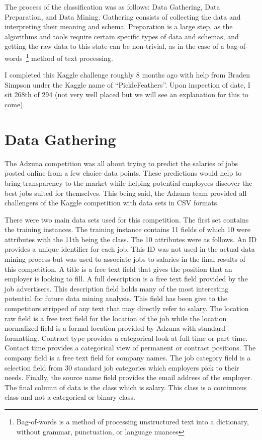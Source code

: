 \documentclass[conference]{IEEEtran}
\begin{document}
The process of the classification was as follows: Data Gathering, Data Preparation, and Data Mining. Gathering consists of 
collecting the data and interpreting their meaning and schema. Preparation is a large step, as the algorithms and tools require 
certain specific types of data and schemas, and getting the raw data to this state can be non-trivial, as in the case of a 
bag-of-words~\footnote{Bag-of-words is a method of processing unstructured text into a dictionary, without grammar, 
punctuation, or language nuances} method of text processing.

I completed this Kaggle challenge roughly 8 months ago with help from Braden Simpson under the Kaggle name
of ``PickleFeathers''. Upon inspection of date, I sit 268th of 294
(not very well placed but we will see an explanation for this to come).

\section{Data Gathering}

The Adzuna competition was all about trying to predict the salaries of jobs posted
online from a few choice data points. These predictions would help to bring transparency 
to the market while helping potential employees discover the best jobs suited for themselves. 
This being said, the Adzuna team provided all challengers of the Kaggle competition 
with data sets in CSV formats.

There were two main data sets used for this competition. The first set contains the training instances. 
The training instance contains 11 fields of which 10 were attributes with the 11th being the class. 
The 10 attributes were as follows. An ID provides a unique identifier for each job. This ID was 
not used in the actual data mining process but was used to associate jobs to salaries
in the final results of this competition. A title is a free text field that gives the position that an
employer is looking to fill. A full description is a free text field provided by the
job advertisers. This description field holds many of the most interesting potential for future data
mining analysis. This field has been give to the competitors stripped of any text that may directly
refer to salary. The location raw field is a free text field for the location of the job while the
location normalized field is a formal location provided by Adzuna with standard formatting. Contract type
provides a categorical look at full time or part time. Contact time provides a categorical view of
permanent or contract positions. The company field is a free text field for company names. The job category
field is a selection field from 30 standard job categories which employers pick to their needs. Finally, the source
name field provides the email address of the employer. The final column of data is the class which is salary. 
This class is a continuous class and not a categorical or binary class.
\end{document}
